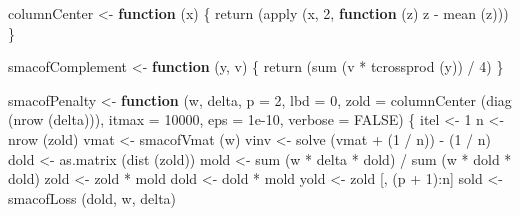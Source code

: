 \documentclass[
  12pt,
  letterpaper,
  DIV=11,
  numbers=noendperiod]{scrreprt}
\newenvironment{Shaded}{\begin{snugshade}}{\end{snugshade}}
\newcommand{\AttributeTok}[1]{\textcolor[rgb]{0.40,0.45,0.13}{#1}}
\newcommand{\ConstantTok}[1]{\textcolor[rgb]{0.56,0.35,0.01}{#1}}
\newcommand{\ControlFlowTok}[1]{\textcolor[rgb]{0.00,0.23,0.31}{\textbf{#1}}}
\newcommand{\DecValTok}[1]{\textcolor[rgb]{0.68,0.00,0.00}{#1}}
\newcommand{\FloatTok}[1]{\textcolor[rgb]{0.68,0.00,0.00}{#1}}
\newcommand{\FunctionTok}[1]{\textcolor[rgb]{0.28,0.35,0.67}{#1}}
\newcommand{\NormalTok}[1]{\textcolor[rgb]{0.00,0.23,0.31}{#1}}
\newcommand{\OtherTok}[1]{\textcolor[rgb]{0.00,0.23,0.31}{#1}}
\newcommand{\SpecialCharTok}[1]{\textcolor[rgb]{0.37,0.37,0.37}{#1}}
\theoremstyle{remark}
\begin{document}
\begin{Shaded}
\begin{Highlighting}[]
\NormalTok{columnCenter }\OtherTok{\textless{}{-}} \ControlFlowTok{function}\NormalTok{ (x) \{}
  \FunctionTok{return}\NormalTok{ (}\FunctionTok{apply}\NormalTok{ (x, }\DecValTok{2}\NormalTok{, }\ControlFlowTok{function}\NormalTok{ (z)}
\NormalTok{    z }\SpecialCharTok{{-}} \FunctionTok{mean}\NormalTok{ (z)))}
\NormalTok{\}}

\NormalTok{smacofComplement }\OtherTok{\textless{}{-}} \ControlFlowTok{function}\NormalTok{ (y, v) \{}
  \FunctionTok{return}\NormalTok{ (}\FunctionTok{sum}\NormalTok{ (v }\SpecialCharTok{*} \FunctionTok{tcrossprod}\NormalTok{ (y)) }\SpecialCharTok{/} \DecValTok{4}\NormalTok{)}
\NormalTok{\}}

\NormalTok{smacofPenalty }\OtherTok{\textless{}{-}}
  \ControlFlowTok{function}\NormalTok{ (w,}
\NormalTok{            delta,}
            \AttributeTok{p =} \DecValTok{2}\NormalTok{,}
            \AttributeTok{lbd =} \DecValTok{0}\NormalTok{,}
            \AttributeTok{zold =} \FunctionTok{columnCenter}\NormalTok{ (}\FunctionTok{diag}\NormalTok{ (}\FunctionTok{nrow}\NormalTok{ (delta))),}
            \AttributeTok{itmax =} \DecValTok{10000}\NormalTok{,}
            \AttributeTok{eps =} \FloatTok{1e{-}10}\NormalTok{,}
            \AttributeTok{verbose =} \ConstantTok{FALSE}\NormalTok{) \{}
\NormalTok{    itel }\OtherTok{\textless{}{-}} \DecValTok{1}
\NormalTok{    n }\OtherTok{\textless{}{-}} \FunctionTok{nrow}\NormalTok{ (zold)}
\NormalTok{    vmat }\OtherTok{\textless{}{-}} \FunctionTok{smacofVmat}\NormalTok{ (w)}
\NormalTok{    vinv }\OtherTok{\textless{}{-}} \FunctionTok{solve}\NormalTok{ (vmat }\SpecialCharTok{+}\NormalTok{ (}\DecValTok{1} \SpecialCharTok{/}\NormalTok{ n)) }\SpecialCharTok{{-}}\NormalTok{ (}\DecValTok{1} \SpecialCharTok{/}\NormalTok{ n)}
\NormalTok{    dold }\OtherTok{\textless{}{-}} \FunctionTok{as.matrix}\NormalTok{ (}\FunctionTok{dist}\NormalTok{ (zold))}
\NormalTok{    mold }\OtherTok{\textless{}{-}} \FunctionTok{sum}\NormalTok{ (w }\SpecialCharTok{*}\NormalTok{ delta }\SpecialCharTok{*}\NormalTok{ dold) }\SpecialCharTok{/} \FunctionTok{sum}\NormalTok{ (w }\SpecialCharTok{*}\NormalTok{ dold }\SpecialCharTok{*}\NormalTok{ dold)}
\NormalTok{    zold }\OtherTok{\textless{}{-}}\NormalTok{ zold }\SpecialCharTok{*}\NormalTok{ mold}
\NormalTok{    dold }\OtherTok{\textless{}{-}}\NormalTok{ dold }\SpecialCharTok{*}\NormalTok{ mold}
\NormalTok{    yold }\OtherTok{\textless{}{-}}\NormalTok{ zold [, (p }\SpecialCharTok{+} \DecValTok{1}\NormalTok{)}\SpecialCharTok{:}\NormalTok{n]}
\NormalTok{    sold }\OtherTok{\textless{}{-}} \FunctionTok{smacofLoss}\NormalTok{ (dold, w, delta)}

\end{Highlighting}
\end{Shaded}
\end{document}
